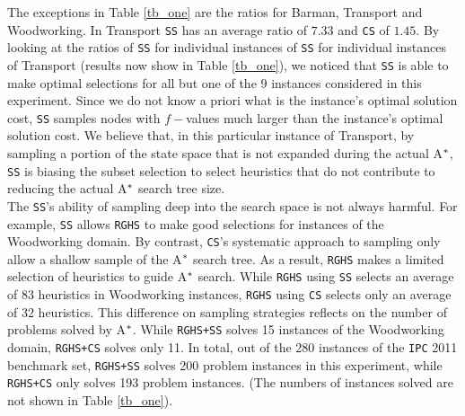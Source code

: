 The exceptions in Table \ref{tb_one} are the ratios for Barman, Transport and Woodworking. In Transport \texttt{SS} has an average ratio of $7.33$ and \texttt{CS} of $1.45$. By looking at the ratios of \texttt{SS} for individual instances of \texttt{SS} for individual instances of Transport (results now show in Table \ref{tb_one}), we noticed that \texttt{SS} is able to make optimal selections for all but one of the 9 instances considered in this experiment. Since we do not know a priori what is the instance's optimal solution cost, \texttt{SS} samples nodes with $f-$values much larger than the instance's optimal solution cost. We believe that, in this particular instance of Transport, by sampling a portion of the state space that is not expanded during the actual A$\sp{*}$, \texttt{SS} is biasing the subset selection to select heuristics that do not contribute to reducing the actual A$\sp{*}$ search tree size.\\

The \texttt{SS}'s ability of sampling deep into the search space is not always harmful. For example, \texttt{SS} allows \texttt{RGHS} to make good selections for instances of the Woodworking domain. By contrast, \texttt{CS}'s systematic approach to sampling only allow a shallow sample of the A$\sp{*}$ search tree. As a result, \texttt{RGHS} makes a limited selection of heuristics to guide A$\sp{*}$ search. While \texttt{RGHS} using \texttt{SS} selects an average of 83 heuristics in Woodworking instances, \texttt{RGHS} using \texttt{CS} selects only an average of 32 heuristics. This difference on sampling strategies reflects on the number of problems solved by A$\sp{*}$. While \texttt{RGHS+SS} solves 15 instances of the Woodworking domain, \texttt{RGHS+CS} solves only 11. In total, out of the 280 instances of the \texttt{IPC} 2011 benchmark set, \texttt{RGHS+SS} solves 200 problem instances in this experiment, while \texttt{RGHS+CS} only solves 193 problem instances. (The numbers of instances solved are not shown in Table \ref{tb_one}).

